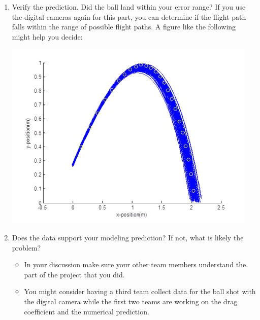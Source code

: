\documentclass[twoside,11pt,ShortChapTitles]{BYUTextbook}
\begin{document}
\begin{enumerate}
\item Verify the prediction. Did the ball land within your error range? If
you use the digital cameras again for this part, you can determine if the
flight path falls within the range of possible flight paths. A figure like
the following might help you decide:

\includegraphics[scale=0.5]{Lab9_figs/old_images-059.png}

\item Does the data support your modeling prediction? If not, what is likely
the problem?

\begin{itemize}
\item In your discussion make sure your other team members understand the
part of the project that you did.

\item You might consider having a third team collect data for the ball shot
with the digital camera while the first two teams are working on the drag
coefficient and the numerical prediction.
\end{itemize}


\end{enumerate}
\end{document}

